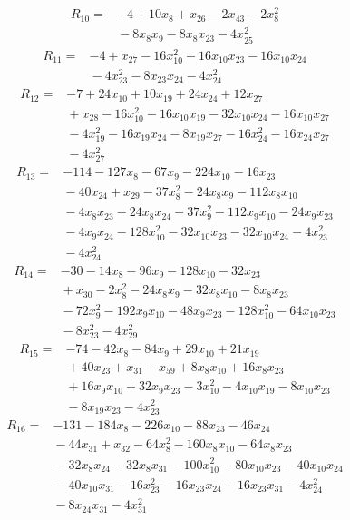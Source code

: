 \documentclass[11pt]{article}
\theoremstyle{definition}
\theoremstyle{remark}
\begin{document}
\begin{align*}
R_{10} ={}& -4 + 10x_{8} + x_{26} - 2x_{43} - 2x_{8}^{2} \\
&{} -8x_{8} x_{9} - 8x_{8} x_{23} - 4x_{25}^{2}
\end{align*}
\begin{align*}
R_{11} ={}& -4 + x_{27} - 16x_{10}^{2} - 16x_{10} x_{23} - 16x_{10} x_{24} \\
&{} -4x_{23}^{2} - 8x_{23} x_{24} - 4x_{24}^{2}
\end{align*}
\begin{align*}
R_{12} ={}& -7 + 24x_{10} + 10x_{19} + 24x_{24} + 12x_{27} \\
&{} + x_{28} - 16x_{10}^{2} - 16x_{10} x_{19} - 32x_{10} x_{24} - 16x_{10} x_{27} \\
&{} -4x_{19}^{2} - 16x_{19} x_{24} - 8x_{19} x_{27} - 16x_{24}^{2} - 16x_{24} x_{27} \\
&{} -4x_{27}^{2}
\end{align*}
\begin{align*}
R_{13} ={}& -114 - 127x_{8} - 67x_{9} - 224x_{10} - 16x_{23} \\
&{} -40x_{24} + x_{29} - 37x_{8}^{2} - 24x_{8} x_{9} - 112x_{8} x_{10} \\
&{} -4x_{8} x_{23} - 24x_{8} x_{24} - 37x_{9}^{2} - 112x_{9} x_{10} - 24x_{9} x_{23} \\
&{} -4x_{9} x_{24} - 128x_{10}^{2} - 32x_{10} x_{23} - 32x_{10} x_{24} - 4x_{23}^{2} \\
&{} -4x_{24}^{2}
\end{align*}
\begin{align*}
R_{14} ={}& -30 - 14x_{8} - 96x_{9} - 128x_{10} - 32x_{23} \\
&{} + x_{30} - 2x_{8}^{2} - 24x_{8} x_{9} - 32x_{8} x_{10} - 8x_{8} x_{23} \\
&{} -72x_{9}^{2} - 192x_{9} x_{10} - 48x_{9} x_{23} - 128x_{10}^{2} - 64x_{10} x_{23} \\
&{} -8x_{23}^{2} - 4x_{29}^{2}
\end{align*}
\begin{align*}
R_{15} ={}& -74 - 42x_{8} - 84x_{9} + 29x_{10} + 21x_{19} \\
&{} + 40x_{23} + x_{31} - x_{59} + 8x_{8} x_{10} + 16x_{8} x_{23} \\
&{} + 16x_{9} x_{10} + 32x_{9} x_{23} - 3x_{10}^{2} - 4x_{10} x_{19} - 8x_{10} x_{23} \\
&{} -8x_{19} x_{23} - 4x_{23}^{2}
\end{align*}
\begin{align*}
R_{16} ={}& -131 - 184x_{8} - 226x_{10} - 88x_{23} - 46x_{24} \\
&{} -44x_{31} + x_{32} - 64x_{8}^{2} - 160x_{8} x_{10} - 64x_{8} x_{23} \\
&{} -32x_{8} x_{24} - 32x_{8} x_{31} - 100x_{10}^{2} - 80x_{10} x_{23} - 40x_{10} x_{24} \\
&{} -40x_{10} x_{31} - 16x_{23}^{2} - 16x_{23} x_{24} - 16x_{23} x_{31} - 4x_{24}^{2} \\
&{} -8x_{24} x_{31} - 4x_{31}^{2}
\end{align*}
\end{document}
